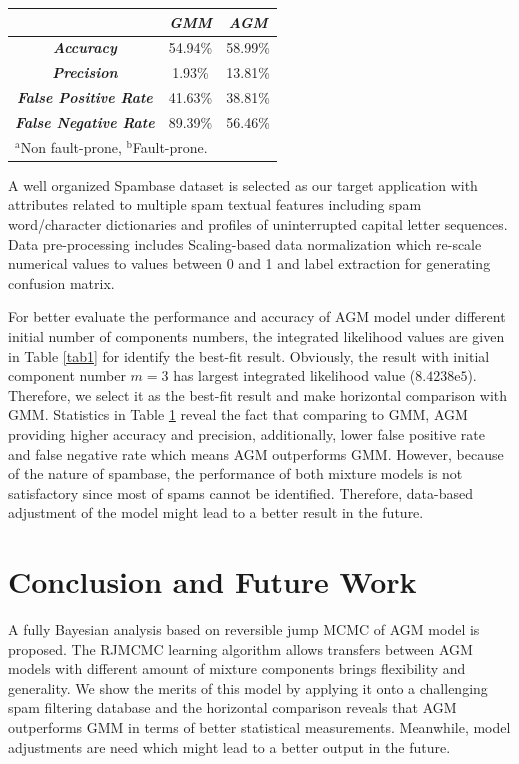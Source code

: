 \documentclass[conference]{IEEEtran}
\begin{document}
\begin{table}[b]
\begin{center}
\begin{tabular}{|c|c|c|}
\hline
 & \multicolumn{1}{|p{1.5cm}|}{\centering \textbf{\textit{GMM}}} & \multicolumn{1}{|p{1.5cm}|}{\centering \textbf{\textit{AGM}}}\\
\hline
\multicolumn{1}{|p{2.5cm}|}{\centering \textbf{\textit{Accuracy}}}  & 54.94\% & 58.99\%\\
\multicolumn{1}{|p{2.5cm}|}{\centering \textbf{\textit{Precision}}} & 1.93\% & 13.81\%\\
\multicolumn{1}{|p{2.5cm}|}{\centering \textbf{\textit{False Positive Rate}}}  & 41.63\% & 38.81\%\\
\multicolumn{1}{|p{2.5cm}|}{\centering \textbf{\textit{False Negative Rate}}} & 89.39\% & 56.46\%\\
\hline
\multicolumn{3}{l}{$^{\mathrm{a}}$Non fault-prone, $^{\mathrm{b}}$Fault-prone.}
\end{tabular}
\end{center}
\label{tab2}
\end{table}
A well organized Spambase dataset\cite{spambase} is selected as our target application with attributes related to multiple spam textual features including spam word/character dictionaries and profiles of uninterrupted capital letter sequences. Data pre-processing includes Scaling-based data normalization which re-scale numerical values to values between 0 and 1 and label extraction for generating confusion matrix. 

For better evaluate the performance and accuracy of AGM model under different initial number of components numbers, the integrated likelihood\cite{b4} values are given in Table \ref{tab1} for identify the best-fit result. Obviously, the result with initial component number $m=3$ has largest integrated likelihood value ($8.4238\mathrm{e}{5}$). Therefore, we select it as the best-fit result and make horizontal comparison with GMM. Statistics in Table \ref{tab2} reveal the fact that comparing to GMM, AGM providing higher accuracy and precision, additionally, lower false positive rate and false negative rate which means AGM outperforms GMM. However, because of the nature of spambase, the performance of both mixture models is not satisfactory since most of spams cannot be identified. Therefore, data-based adjustment of the model might lead to a better result in the future. 

\section{Conclusion and Future Work}
A fully Bayesian analysis based on reversible jump MCMC of AGM model is proposed. The RJMCMC learning algorithm allows transfers between AGM models with different amount of mixture components brings flexibility and generality. We show the merits of this model by applying it onto a challenging spam filtering database and the horizontal comparison reveals that AGM outperforms GMM in terms of better statistical measurements. Meanwhile, model adjustments are need which might lead to a better output in the future.
\end{document}
